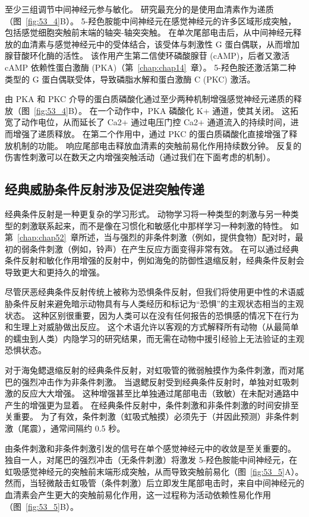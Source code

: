 至少三组调节中间神经元参与敏化。
研究最充分的是使用血清素作为递质（图~\ref{fig:53_4}B）。
5-羟色胺能中间神经元在感觉神经元的许多区域形成突触，包括感觉细胞突触前末端的轴突-轴突突触。
在单次尾部电击后，从中间神经元释放的血清素与感觉神经元中的受体结合，该受体与刺激性 G 蛋白偶联，从而增加腺苷酸环化酶的活性。
该作用产生第二信使环磷酸腺苷 (cAMP)，后者又激活 cAMP 依赖性蛋白激酶 (PKA)（第~\ref{chap:chap14}~章）。
5-羟色胺还激活第二种类型的 G 蛋白偶联受体，导致磷脂水解和蛋白激酶 C (PKC) 激活。


由 PKA 和 PKC 介导的蛋白质磷酸化通过至少两种机制增强感觉神经元递质的释放（图~\ref{fig:53_4}B）。
在一个动作中，PKA 磷酸化 K+ 通道，使其关闭。 这拓宽了动作电位，从而延长了 Ca2+ 通过电压门控 Ca2+ 通道流入的持续时间，进而增强了递质释放。
在第二个作用中，通过 PKC 的蛋白质磷酸化直接增强了释放机制的功能。
响应尾部电击释放血清素的突触前易化作用持续数分钟。
反复的伤害性刺激可以在数天之内增强突触活动（通过我们在下面考虑的机制）。



\subsection{经典威胁条件反射涉及促进突触传递}

经典条件反射是一种更复杂的学习形式。
动物学习将一种类型的刺激与另一种类型的刺激联系起来，而不是像在习惯化和敏感化中那样学习一种刺激的特性。
如第~\ref{chap:chap52}~章所述，当与强烈的非条件刺激（例如，提供食物）配对时，最初的弱条件刺激（例如，铃声）在产生反应方面变得非常有效。
在可以通过经典条件反射和敏化作用增强的反射中，例如海兔的防御性退缩反射，经典条件反射会导致更大和更持久的增强。


尽管厌恶经典条件反射传统上被称为恐惧条件反射，但我们将使用更中性的术语威胁条件反射来避免暗示动物具有与人类经历和标记为“恐惧”的主观状态相当的主观状态。 这种区别很重要，因为人类可以在没有任何报告的恐惧感的情况下在行为和生理上对威胁做出反应。
这个术语允许以客观的方式解释所有动物（从最简单的蠕虫到人类）内隐学习的研究结果，而无需在动物中援引经验上无法验证的主观恐惧状态。


对于海兔鳃退缩反射的经典条件反射，对虹吸管的微弱触摸作为条件刺激，而对尾巴的强烈冲击作为非条件刺激。
当退鳃反射受到经典条件反射时，单独对虹吸刺激的反应大大增强。
这种增强甚至比单独通过尾部电击（致敏）在未配对通路中产生的增强更为显着。 
在经典条件反射中，条件刺激和非条件刺激的时间安排至关重要。
为了有效，条件刺激（虹吸式触摸）必须先于（并因此预测）非条件刺激（尾震），通常间隔约 0.5 秒。


由条件刺激和非条件刺激引发的信号在单个感觉神经元中的收敛是至关重要的。
独自一人，对尾巴的强烈冲击（无条件刺激）将激发 5-羟色胺能中间神经元，在虹吸感觉神经元的突触前末端形成突触，从而导致突触前易化（图~\ref{fig:53_5}A）。
然而，当轻微敲击虹吸管（条件刺激）后立即发生尾部电击时，来自中间神经元的血清素会产生更大的突触前易化作用，这一过程称为活动依赖性易化作用（图~\ref{fig:53_5}B）。


